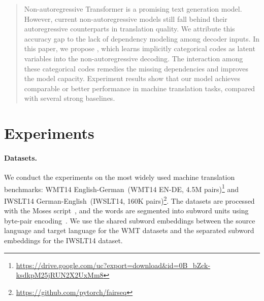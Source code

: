 

\begin{abstract}
Non-autoregressive Transformer is a promising text generation model. 
However, current non-autoregressive models still fall behind their autoregressive counterparts in translation quality. 
We attribute this accuracy gap to the lack of dependency modeling among decoder inputs. 
In this paper, we propose \method, which learns implicitly categorical codes as latent variables into the non-autoregressive decoding. 
The interaction among these categorical codes remedies the missing dependencies and improves the model capacity.
Experiment results show that our model achieves comparable or better performance in machine translation tasks, compared with several strong baselines.
\end{abstract}
\section{Experiments}\label{s:exp}
\paragraph{Datasets.} 
We conduct the experiments on the most widely used machine translation benchmarks: WMT14 English-German~(WMT14 EN-DE, 4.5M pairs)\footnote{\url{https://drive.google.com/uc?export=download&id=0B_bZck-ksdkpM25jRUN2X2UxMm8}} and IWSLT14 German-English~(IWSLT14, 160K pairs)\footnote{ \url{https://github.com/pytorch/fairseq}}. 
The datasets are processed with the Moses script~\citep{Moses}, and the words are segmented into subword units using byte-pair encoding~\citep[BPE]{bpe}.  
We use the shared subword embeddings between the source language and target language for the WMT datasets and the separated subword embeddings for the IWSLT14 dataset.
   
